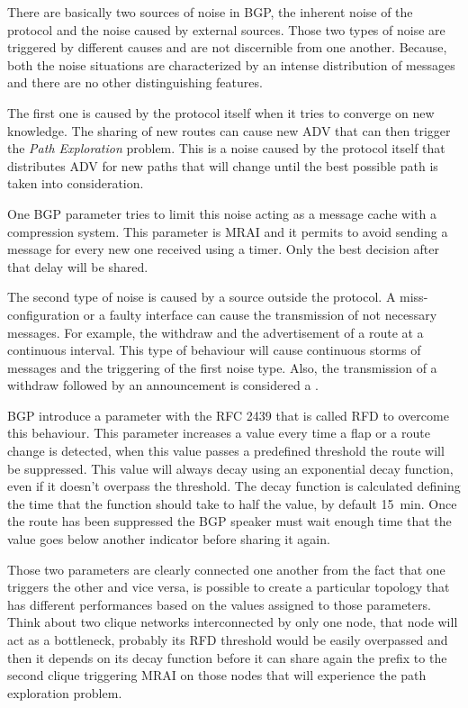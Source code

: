 There are basically two sources of noise in \ac{BGP}, the inherent noise of
the protocol and the noise caused by external sources.
Those two types of noise are triggered by different causes and are
not discernible from one another.
Because, both the noise situations are characterized by an intense distribution
of messages and there are no other distinguishing features.

The first one is caused by the protocol itself when it tries to converge
on new knowledge.
The sharing of new routes can cause new \ac{ADV} that can then trigger the
\textit{Path Exploration} problem.
This is a noise caused by the protocol itself that distributes \ac{ADV} for
new paths that will change until the best possible path is taken into consideration.

One \ac{BGP} parameter tries to limit this noise acting as a message cache with
a compression system.
This parameter is \ac{MRAI} and it permits to avoid sending a message for every
new one received using a timer.
Only the best decision after that delay will be shared.

The second type of noise is caused by a source outside the protocol.
A miss-configuration or a faulty interface can cause the transmission of not necessary messages.
For example, the withdraw and the advertisement of a route at a continuous interval.
This type of behaviour will cause continuous storms of messages and the triggering
of the first noise type.
Also, the transmission of a withdraw followed by an announcement is considered
a .

\ac{BGP} introduce a parameter with the \ac{RFC} \num{2439} \cite{rfc2439} that
is called \ac{RFD} to overcome this behaviour.
This parameter increases a value every time a flap or a route change is detected,
when this value passes a predefined threshold the route will be suppressed.
This value will always decay using an exponential decay function, even if it
doesn't overpass the threshold.
The decay function is calculated defining the time that the function should take
to half the value, by default \SI{15}{\minute}.
Once the route has been suppressed the \ac{BGP} speaker must wait enough time
that the value goes below another indicator before sharing it again.

Those two parameters are clearly connected one another from the fact that
one triggers the other and vice versa, is possible to create a particular topology
that has different performances based on the values assigned to those
parameters.
Think about two clique networks interconnected by only one node, that
node will act as a bottleneck, probably its \ac{RFD} threshold would be easily
overpassed and then it depends on its decay function before it can share
again the prefix to the second clique triggering \ac{MRAI} on those nodes that
will experience the path exploration problem.

